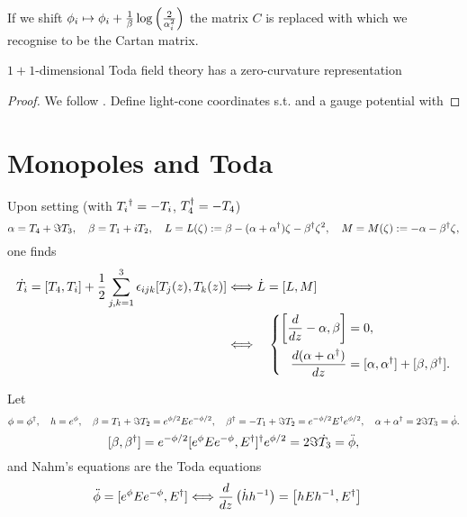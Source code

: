 \documentclass{article}
\begin{document}
\begin{remark}
	If we shift $\phi_i \mapsto \phi_i + \frac{1}{\beta}\log \left( \frac{2}{\alpha_i^2} \right)$ the matrix $C$ is replaced with 
which we recognise to be the Cartan matrix. 
\end{remark}

\begin{prop}
	$1+1$-dimensional Toda field theory has a zero-curvature representation 
\end{prop}
\begin{proof}
	We follow \cite{Olive1983}. Define light-cone coordinates
s.t. 
and a gauge potential with 
\end{proof}




\section{Monopoles and Toda}

Upon setting (with ${T_i}\sp\dagger=-T_i$, $T_4\sp\dagger =-T_4$)
\begin{equation*}
\alpha=T_4+\Im T_3,\quad \beta = T_1+iT_2,
\quad
L=L(\zeta):=\beta -(\alpha+\alpha\sp\dagger)\zeta-\beta\sp\dagger \zeta^2, \quad
M=M(\zeta):=-\alpha-\beta\sp\dagger \zeta,
\end{equation*}
one finds
\begin{equation}
\begin{split}\label{integrability}
\dot{{T}_i} =[T_4,T_i]+\frac12\sum_{j,k=1}^3\epsilon_{ijk}[T_j(z),T_k(z)]
&\Longleftrightarrow
\dot L=[L,M]\\
&\Longleftrightarrow\quad
\left\{\begin{aligned}
\left[\dfrac{d }{dz}-\alpha,\beta\right]&=0,\\
\dfrac{d (\alpha+\alpha\sp\dagger)}{dz}&=[\alpha,\alpha\sp\dagger]+[\beta,\beta\sp\dagger].
\end{aligned}\right.
\end{split}
\end{equation}

Let 
$$\phi=\phi\sp\dagger,\quad h=e^{\phi},\quad
\beta=T_1+\Im T_2=e^{\phi/2} E e^{-\phi/2},\quad
\beta\sp\dagger=-T_1+\Im T_2=e^{-\phi/2} E\sp\dagger e^{\phi/2},\quad
\alpha+\alpha\sp\dagger=2\Im T_3 =\dot \phi.
$$
$$[\beta, \beta\sp\dagger]=e^{-\phi/2}[ e^{\phi}E  e^{-\phi} ,E\sp\dagger ]   \sp\dagger e^{\phi/2}
=2\Im\dot T_3= \ddot \phi,
$$
and Nahm's equations are the Toda equations
\begin{align*} 
\ddot\phi&=[ e^{\phi}E  e^{-\phi} ,E\sp\dagger ] 
\Longleftrightarrow
\frac{d}{dz} \left( \dot h h\sp{-1} \right)= \left[ h E h\sp{-1}, E\sp\dagger\right]
\end{align*}
\end{document}
